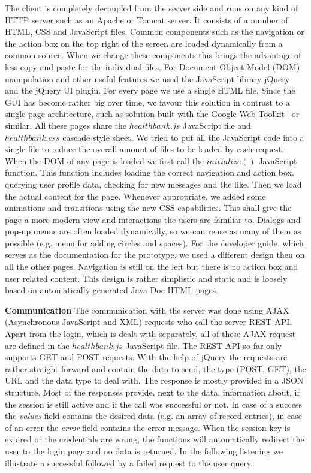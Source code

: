 The client is completely decoupled from the server side and runs on any kind of HTTP server such as an Apache or Tomcat server. It consists of a number of HTML, CSS and JavaScript files. Common components such as the navigation or the action box on the top right of the screen are loaded dynamically from a common source. When we change these components this brings the advantage of less copy and paste for the individual files. For Document Object Model (DOM) manipulation and other useful features we used the JavaScript library jQuery~\cite{jQuery} and the jQuery UI plugin. 
\newline
For every page we use a single HTML file. Since the GUI has become rather big over time, we favour this solution in contrast to a single page architecture, such as solution built with the Google Web Toolkit~\cite{gwt} or similar. All these pages share the $healthbank.js$ JavaScript file and $healthbank.css$ cascade style sheet. We tried to put all the JavaScript code into a single file to reduce the overall amount of files to be loaded by each request. When the DOM of any page is loaded we first call the $initialize()$ JavaScript function. This function includes loading the correct navigation and action box, querying user profile data, checking for new messages and the like. Then we load the actual content for the page. Whenever appropriate, we added some animations and transitions using the new CSS capabilities. This shall give the page a more modern view and interactions the users are familiar to. Dialogs and pop-up menus are often loaded dynamically, so we can reuse as many of them as possible (e.g. menu for adding circles and spaces). \newline
For the developer guide, which serves as the documentation for the prototype, we used a different design then on all the other pages. Navigation is still on the left but there is no action box and user related content. This design is rather simplistic and static and is loosely based on automatically generated Java Doc HTML pages.

\textbf{Communication} \newline
The communication with the server was done using AJAX (Asynchronous JavaScript and XML) requests who call the server REST API. Apart from the login, which is dealt with separately, all of these AJAX request are defined in the $healthbank.js$ JavaScript file. The REST API so far only supports GET and POST requests. With the help of jQuery the requests are rather straight forward and contain the data to send, the type (POST, GET), the URL and the data type to deal with. The response is mostly provided in a JSON structure. Most of the responses provide, next to the data, information about, if the session is still active and if the call was successful or not. In case of a success the \emph{values} field contains the desired data (e.g. an array of record entries), in case of an error the \emph{error} field contains the error message. When the session key is expired or the credentials are wrong, the functions will automatically redirect the user to the login page and no data is returned. In the following listening we illustrate a successful followed by a failed request to the user query.

